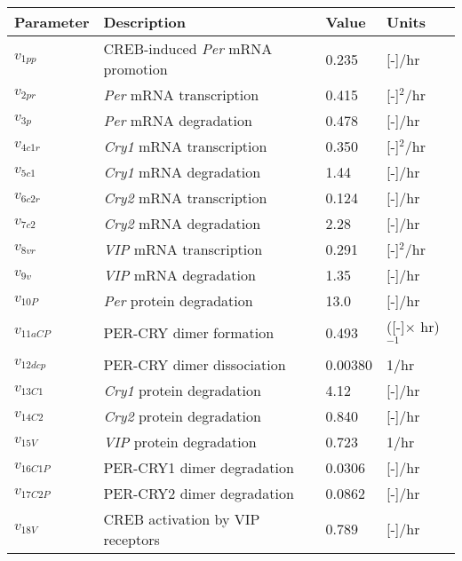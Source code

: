 \begin{table}[p]
\begin{center}
{
\begin{tabular}{l l l l}\hline
	Parameter & Description & Value & Units\\
	\hline
	$v_{1pp}$ & CREB-induced \textit{Per} mRNA promotion & 0.235 & [-]/hr
	\\
	$v_{2pr}$ & \textit{Per} mRNA transcription & 0.415 & [-]$^2$/hr
	\\
	$v_{3p}$ & \textit{Per} mRNA degradation & 0.478 & [-]/hr
	\\
	$v_{4c1r}$ & \textit{Cry1} mRNA transcription & 0.350 & [-]$^2$/hr
	\\
	$v_{5c1}$ & \textit{Cry1} mRNA degradation & 1.44 & [-]/hr
	\\
	$v_{6c2r}$ & \textit{Cry2} mRNA transcription & 0.124 & [-]/hr
	\\
	$v_{7c2}$ & \textit{Cry2} mRNA degradation & 2.28 & [-]/hr
	\\
	$v_{8vr}$ & \textit{VIP} mRNA transcription & 0.291 & [-]$^2$/hr
	\\
	$v_{9v}$ & \textit{VIP} mRNA degradation & 1.35 & [-]/hr
	\\
	$v_{10P}$ & \textit{Per} protein degradation & 13.0 & [-]/hr
	\\
	$v_{11aCP}$ & PER-CRY dimer formation & 0.493 & ([-]$\times$ hr)$^{-1}$
	\\
	$v_{12dcp}$ & PER-CRY dimer dissociation & 0.00380 & 1/hr
	\\
	$v_{13C1}$ & \textit{Cry1} protein degradation & 4.12 & [-]/hr
	\\
	$v_{14C2}$ & \textit{Cry2} protein degradation & 0.840 & [-]/hr
	\\
	$v_{15V}$ & \textit{VIP} protein degradation & 0.723 & 1/hr
	\\
	$v_{16C1P}$ & PER-CRY1 dimer degradation & 0.0306 & [-]/hr
	\\
	$v_{17C2P}$ & PER-CRY2 dimer degradation & 0.0862 & [-]/hr
	\\
	$v_{18V}$ & CREB activation by VIP receptors & 0.789 & [-]/hr

\end{tabular}}
\end{center}
\end{table}

